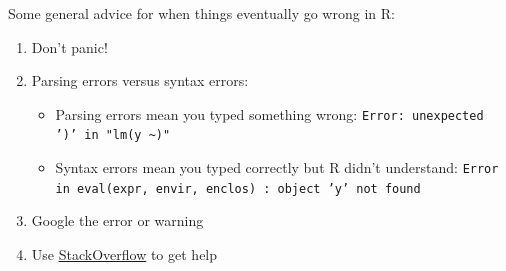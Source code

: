 \documentclass[12pt]{article}\usepackage[]{graphicx}\usepackage[]{color}
\begin{document}
\noindent Some general advice for when things eventually go wrong in R:

\begin{enumerate}
\item Don't panic!
\item Parsing errors versus syntax errors:
	\begin{itemize}
	\item Parsing errors mean you typed something wrong: \texttt{Error: unexpected ')' in "lm(y \textasciitilde)"}
	\item Syntax errors mean you typed correctly but R didn't understand: \texttt{Error in eval(expr, envir, enclos) : object 'y' not found}
	\end{itemize}
\item Google the error or warning
\item Use \href{http://stackoverflow.com/questions/tagged/r}{StackOverflow} to get help
\end{enumerate}
\end{document}
